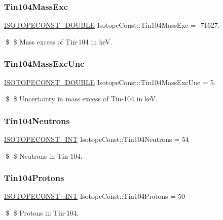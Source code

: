\subsubsection{\texorpdfstring{Tin104\+Mass\+Exc}{Tin104MassExc}}
{\footnotesize\ttfamily \mbox{\hyperlink{group___isotope_const-_macros_ga8f45a7272ce02c0b4c65c44636ed719a}{I\+S\+O\+T\+O\+P\+E\+C\+O\+N\+S\+T\+\_\+\+D\+O\+U\+B\+LE}} Isotope\+Const\+::\+Tin104\+Mass\+Exc = -\/71627.}

\$ \$ Mass excess of Tin-\/104 in keV. \mbox{\label{group___isotope_const-_tin-_sn104_ga7de611f189ee1de30e805ab8b7cb0e11}} 
\subsubsection{\texorpdfstring{Tin104\+Mass\+Exc\+Unc}{Tin104MassExcUnc}}
{\footnotesize\ttfamily \mbox{\hyperlink{group___isotope_const-_macros_ga8f45a7272ce02c0b4c65c44636ed719a}{I\+S\+O\+T\+O\+P\+E\+C\+O\+N\+S\+T\+\_\+\+D\+O\+U\+B\+LE}} Isotope\+Const\+::\+Tin104\+Mass\+Exc\+Unc = 5.}

\$ \$ Uncertainty in mass excess of Tin-\/104 in keV. \mbox{\label{group___isotope_const-_tin-_sn104_ga59b6bc04ed570437dbda0ff73ca72cf9}} 
\subsubsection{\texorpdfstring{Tin104\+Neutrons}{Tin104Neutrons}}
{\footnotesize\ttfamily \mbox{\hyperlink{group___isotope_const-_macros_ga5f18360b3e99483a35c32d789e62621c}{I\+S\+O\+T\+O\+P\+E\+C\+O\+N\+S\+T\+\_\+\+I\+NT}} Isotope\+Const\+::\+Tin104\+Neutrons = 54}

\$ \$ Neutrons in Tin-\/104. \mbox{\label{group___isotope_const-_tin-_sn104_ga226a0c4e0b056efefdf8312f8af9c92c}} 
\subsubsection{\texorpdfstring{Tin104\+Protons}{Tin104Protons}}
{\footnotesize\ttfamily \mbox{\hyperlink{group___isotope_const-_macros_ga5f18360b3e99483a35c32d789e62621c}{I\+S\+O\+T\+O\+P\+E\+C\+O\+N\+S\+T\+\_\+\+I\+NT}} Isotope\+Const\+::\+Tin104\+Protons = 50}

\$ \$ Protons in Tin-\/104. 